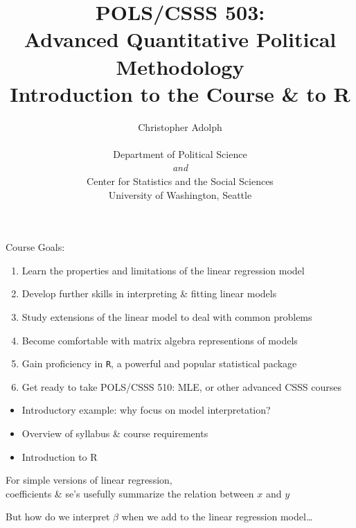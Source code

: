 \documentclass[pdflatex,landscape,titlepage]{foils}
\title{{\large {POLS/CSSS 503: \\
Advanced Quantitative Political Methodology}} \\
\vspace{.75in}
Introduction to the Course \& to R
\vspace{.5in}
}
\author{\textsf{\large Christopher Adolph}\\\vspace{1 em}\\{ 
\textsf{\small Department of Political Science} \\ \vspace{0.5em} \emph{\textsf{\small and}} \\ \vspace{0.0em} \textsf{\small Center for Statistics and the
Social Sciences} \\ \vspace{0.5em}
  \textsf{\small University of Washington, Seattle}}}
\date{}
\begin{document}
\maketitle
\pagestyle{empty}
\clearpage

\bgclear

Course Goals:

\begin{enumerate}

\item Learn the properties and limitations of the linear regression model

\item Develop further skills in interpreting \& fitting linear models

\item Study extensions of the linear model to deal with common problems

\item Become comfortable with matrix algebra representions of models

\item Gain proficiency in \texttt{R}, a powerful and popular statistical package

\item Get ready to take POLS/CSSS 510: MLE,  or other advanced CSSS courses

\end{enumerate}

\bgclear

\begin{itemize}
\item Introductory example:  why focus on model interpretation?

\item Overview of syllabus \& course requirements

\item Introduction to R
\end{itemize}


\bgclear

For simple versions of linear regression,\\ coefficients \&
se's usefully summarize the relation between $x$ and $y$

But how do we interpret $\beta$ when we add to the linear regression model\ldots
\end{document}
